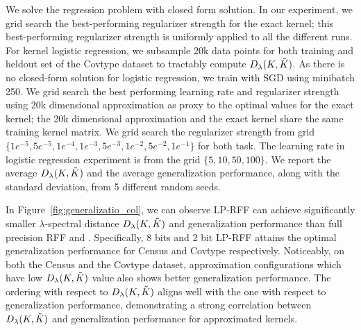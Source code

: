 We solve the regression problem with closed form solution. In our experiment, we grid search the best-performing regularizer strength for the exact kernel; this best-performing regularizer strength is uniformly applied to all the different runs. For kernel logistic regression, we subsample 20k data points for both training and heldout set of the Covtype dataset to tractably compute $D_{\lambda}(K,\tilde{K})$. As there is no closed-form solution for logistic regression, we train with SGD using minibatch 250. We grid search the best performing learning rate and regularizer strength using 20k dimensional \Nystrom approximation as proxy to the optimal values for the exact kernel; the 20k dimensional \Nystrom approximation and the exact kernel share the same training kernel matrix. We grid search the regularizer strength from grid $\{1e^{-5}, 5e^{-5}, 1e^{-4}, 1e^{-3}, 5e^{-3}, 1e^{-2}, 5e^{-2}, 1e^{-1}\}$ for both task. The learning rate in logistic regression experiment is from the grid $\{5, 10, 50, 100\}$. We report the average $D_{\lambda}(K,\tilde{K})$ and the average generalization performance, along with the standard deviation, from 5 different random seeds.

In Figure~\ref{fig:generalizatio_col}, we can observe LP-RFF can achieve significantly smaller $\lambda$-spectral distance $D_{\lambda}(K,\tilde{K})$ and generalization performance than full precision RFF and \Nystrom. Specifically, 8 bits and 2 bit LP-RFF attains the optimal generalization performance for Census and Covtype respectively. Noticeably, on both the Census and the Covtype dataset, approximation configurations which have low $D_{\lambda}(K,\tilde{K})$ value also shows better generalization performance. The ordering with respect to $D_{\lambda}(K,\tilde{K})$ aligns well with the one with respect to generalization performance, demonstrating a strong correlation between $D_{\lambda}(K,\tilde{K})$ and generalization performance for approximated kernels.

